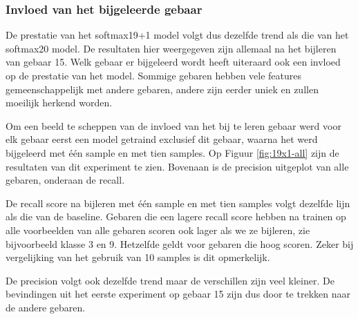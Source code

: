 \subsubsection{Invloed van het bijgeleerde gebaar}

De prestatie van het softmax19+1 model volgt dus dezelfde trend als die van het softmax20 model. De resultaten hier weergegeven zijn allemaal na het bijleren van gebaar 15. Welk gebaar er bijgeleerd wordt heeft uiteraard ook een invloed op de prestatie van het model. Sommige gebaren hebben vele features gemeenschappelijk met andere gebaren, andere zijn eerder uniek en zullen moeilijk herkend worden.

\npar Om een beeld te scheppen van de invloed van het bij te leren gebaar werd voor elk gebaar eerst een model getraind exclusief dit gebaar, waarna het werd bijgeleerd met \'e\'en sample en met tien samples. Op Figuur \ref{fig:19x1-all} zijn de resultaten van dit experiment te zien. Bovenaan is de precision uitgeplot van alle gebaren, onderaan de recall.

\npar De recall score na bijleren met \'e\'en sample en met tien samples volgt dezelfde lijn als die van de baseline. Gebaren die een lagere recall score hebben na trainen op alle voorbeelden van alle gebaren scoren ook lager als we ze bijleren, zie bijvoorbeeld klasse 3 en 9. Hetzelfde geldt voor gebaren die hoog scoren. Zeker bij vergelijking van het gebruik van 10 samples is dit opmerkelijk.

\npar De precision volgt ook dezelfde trend maar de verschillen zijn veel kleiner. De bevindingen uit het eerste experiment op gebaar 15 zijn dus door te trekken naar de andere gebaren.


